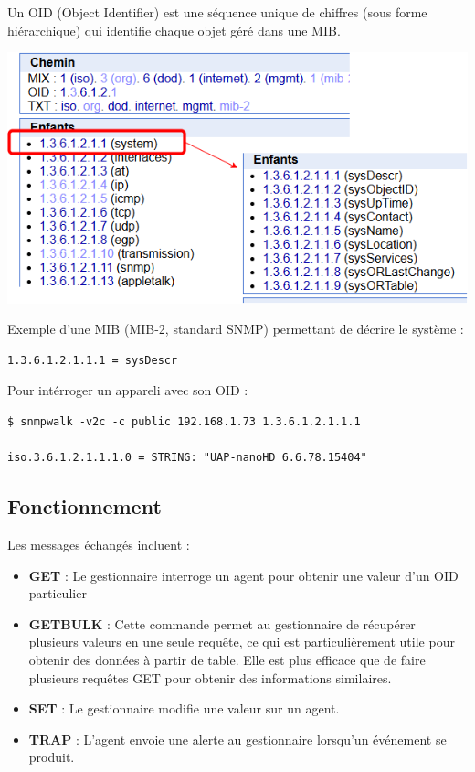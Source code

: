 \documentclass[french, 12pt]{article}%
\newcommand{\itemE}{\item[$\bullet$]}
\newcommand{\titreencadre}{Titre}
\newenvironment{encadre}[1]{\renewcommand{\titreencadre}{#1}
	\begin{mdframed}[style=encadrestyle]
	\vspace{0.5\baselineskip}
	}{%
	\end{mdframed}}
\begin{document}
\begin{encadre}{OID }
Un OID (Object Identifier) est une séquence unique de chiffres (sous forme hiérarchique) qui identifie chaque objet géré dans une MIB.
\end{encadre}

\begin{center}
\includegraphics[scale=0.5]{./ressource/exMib}
\end{center}

Exemple d’une MIB (MIB-2, standard SNMP) permettant de décrire le système :
\begin{lstlisting}[style=commande]
1.3.6.1.2.1.1.1 = sysDescr
\end{lstlisting}

Pour intérroger un appareli avec son OID : 
\begin{lstlisting}[style=commande]
$ snmpwalk -v2c -c public 192.168.1.73 1.3.6.1.2.1.1.1

iso.3.6.1.2.1.1.1.0 = STRING: "UAP-nanoHD 6.6.78.15404"
\end{lstlisting}
\subsection*{Fonctionnement}
Les messages échangés incluent :
\begin{itemize}
    \itemE \textbf{GET} : Le gestionnaire interroge un agent pour obtenir une valeur d'un OID particulier
    \item \textbf{GETBULK} : Cette commande permet au gestionnaire de récupérer plusieurs valeurs en une seule requête, ce qui est particulièrement utile pour obtenir des données à partir de table. Elle est plus efficace que de faire plusieurs requêtes GET pour obtenir des informations similaires.
    \itemE \textbf{SET} : Le gestionnaire modifie une valeur sur un agent.
    \itemE \textbf{TRAP} : L’agent envoie une alerte au gestionnaire lorsqu’un événement se produit.
\end{itemize}
\end{document}
